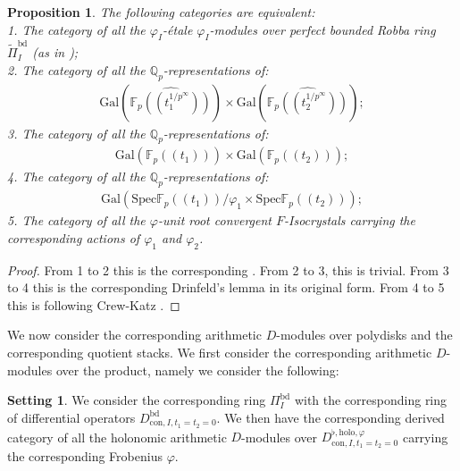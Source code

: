 \documentclass[11pt]{book}
\newtheorem{proposition}[theorem]{Proposition}
\theoremstyle{definition}
\numberwithin{equation}{section}
\newtheorem{setting}[theorem]{Setting}
\begin{document}
\begin{proposition}
The following categories are equivalent:\\
1. The category of all the $\varphi_I$-\'etale $\varphi_I$-modules over perfect bounded Robba ring $\widetilde{\Pi}_I^\mathrm{bd}$ (as in \cite[Section 2.3]{CKZ});\\
2. The category of all the $\mathbb{Q}_p$-representations of:
\begin{align}
\mathrm{Gal}(\widehat{\mathbb{F}_p((t_1^{1/p^\infty}))})\times \mathrm{Gal}(\widehat{\mathbb{F}_p((t_2^{1/p^\infty}))});	
\end{align}
3. The category of all the $\mathbb{Q}_p$-representations of:
\begin{align}
\mathrm{Gal}({\mathbb{F}_p((t_1^{}))})\times \mathrm{Gal}({\mathbb{F}_p((t_2^{}))});
\end{align}	
4. The category of all the $\mathbb{Q}_p$-representations of:
\begin{align}
\mathrm{Gal}(\mathrm{Spec}\mathbb{F}_p((t_1))/\varphi_1\times \mathrm{Spec}\mathbb{F}_p((t_2)));
\end{align}	
5. The category of all the $\varphi$-unit root convergent $F$-Isocrystals	carrying the corresponding actions of $\varphi_1$ and $\varphi_2$.

\end{proposition}



\begin{proof}
From 1 to 2 this is the corresponding \cite[Theorem 6.16]{CKZ}. From 2 to 3, this is trivial. From 3 to 4 this is the corresponding Drinfeld's lemma in its original form. From 4 to 5 this is following Crew-Katz \cite[Theorem 2.1]{Cr2}. 	
\end{proof}



\indent We now consider the corresponding arithmetic $D$-modules over polydisks and the corresponding quotient stacks. We first consider the corresponding arithmetic $D$-modules over the product, namely we consider the following:


\begin{setting}
We consider the corresponding ring $\Pi_I^\mathrm{bd}$ with the corresponding ring of differential operators $D_{\mathrm{con},I,t_1=t_2=0}^\mathrm{bd}$. We then have the corresponding derived category of all the holonomic arithmetic $D$-modules over $D_{\mathrm{con},I,t_1=t_2=0}^{\flat,\mathrm{holo},\varphi}$ carrying the corresponding Frobenius $\varphi$. 	
\end{setting}
\end{document}
